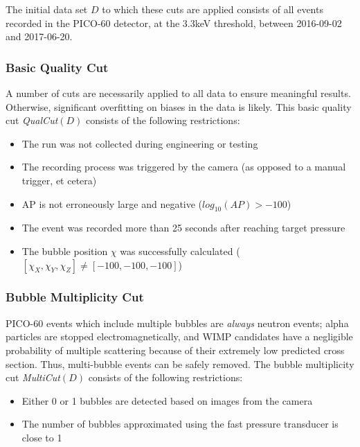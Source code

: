 \documentclass[10pt]{article}
\begin{document}
The initial data set $D$ to which these cuts are applied consists of all events recorded in the PICO-60 detector, at the 3.3keV threshold, between 2016-09-02 and 2017-06-20.

\subsubsection{Basic Quality Cut}

A number of cuts are necessarily applied to all data to ensure meaningful results. Otherwise, significant overfitting on biases in the data is likely. This basic quality cut {\it QualCut}$(D)$ consists of the following restrictions:

\begin{itemize}
    \item The run was not collected during engineering or testing
    \item The recording process was triggered by the camera (as opposed to a manual trigger, et cetera)
    \item AP is not erroneously large and negative ($log_{10}(AP)>-100$)
    \item The event was recorded more than 25 seconds after reaching target pressure
    \item The bubble position $\chi$ was successfully calculated ($[\chi_{X}, \chi_{Y}, \chi_{Z}]\neq[-100, -100, -100]$)
\end{itemize}

\subsubsection{Bubble Multiplicity Cut}

PICO-60 events which include multiple bubbles are \textit{always} neutron events; alpha particles are stopped electromagnetically, and WIMP candidates have a negligible probability of multiple scattering because of their extremely low predicted cross section. Thus, multi-bubble events can be safely removed. The bubble multiplicity cut {\it MultiCut}$(D)$ consists of the following restrictions:

\begin{itemize}
    \item Either 0 or 1 bubbles are detected based on images from the camera
    \item The number of bubbles approximated using the fast pressure transducer is close to 1
\end{itemize}
\end{document}
